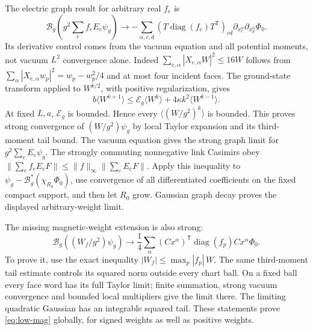 The electric graph result for arbitrary real $f_e$ is
\[
 \mathcal B_g\left(g^2\sum_ef_eE_e\psi_g\right)
 \longrightarrow
 -\sum_{\alpha,c,d}(T\operatorname{diag}(f_e)T^{\mathsf T})_{cd}
              \partial_{x_c^\alpha}\partial_{x_d^\alpha}\Phi_0 .
\]
Its derivative control comes from the vacuum equation and all potential
moments, not vacuum $L^2$ convergence alone. Indeed
$\sum_{e,\alpha}|X_{e,\alpha}W|^2\le16W$ follows from
$\sum_\alpha|X_{e,\alpha}w_p|^2=w_p-w_p^2/4$ and at most four incident
faces. The ground-state transform applied to $W^{k/2}$, with positive
regularization, gives
\[
 b\langle W^{k+1}\rangle
 \le\mathcal E_g\langle W^k\rangle+4\kappa k^2\langle W^{k-1}\rangle.
\]
At fixed $L,a$, $\mathcal E_g$ is bounded. Hence every
$\langle(W/g^2)^k\rangle$ is bounded. This proves strong convergence
of $(W/g^2)\psi_g$ by local Taylor expansion and its third-moment
tail bound. The vacuum equation gives the strong graph limit for
$g^2\sum_eE_e\psi_g$.
The strongly commuting nonnegative link Casimirs obey
$\|\sum_ef_eE_eF\|\le\|f\|_\infty\|\sum_eE_eF\|$.
Apply this inequality to $\psi_g-\mathcal B_g^*(\chi_{R_0}\Phi_0)$,
use convergence of all differentiated coefficients on the fixed
compact support, and then let $R_0$ grow. Gaussian graph decay proves
the displayed arbitrary-weight limit.

The missing magnetic-weight extension is also strong:
\begin{equation}\label{eq:low-mag}
 \mathcal B_g((W_f/g^2)\psi_g)
 \longrightarrow \frac14\sum_\alpha
 (Cx^\alpha)^{\mathsf T}\operatorname{diag}(f_p)Cx^\alpha\Phi_0.
\end{equation}
To prove it, use the exact inequality
$|W_f|\le\max_p|f_p|\,W$. The same third-moment tail estimate controls
its squared norm outside every chart ball. On a fixed ball every face
word has its full Taylor limit; finite summation, strong vacuum
convergence and bounded local multipliers give the limit there.
The limiting quadratic Gaussian has an integrable squared tail.
These statements prove \eqref{eq:low-mag} globally, for signed weights
as well as positive weights.

